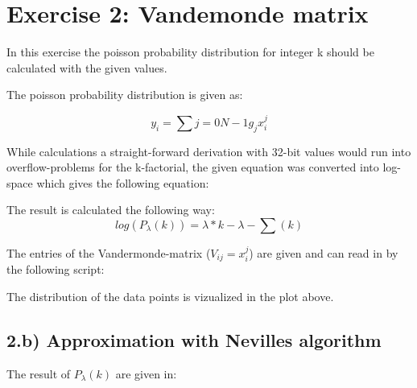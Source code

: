 \section{Exercise 2: Vandemonde matrix}

In this exercise the poisson probability distribution for integer k should be calculated with the given values.

The poisson probability distribution is given as:

\begin{equation}
	y_i = \sum{j=0}{N-1} g_j x_i^j
\end{equation}

While calculations a straight-forward derivation with 32-bit values would run into overflow-problems for the k-factorial, the given equation was converted into log-space which gives the following equation:
 
The result is calculated the following way:
\begin{equation}
	log(P_{\lambda}(k)) = \lambda *k - \lambda - \sum(k)
\end{equation}

The entries of the Vandermonde-matrix ($V_{ij} = x_i^j$) are given and can read in by the following script:
 


The distribution of the data points is vizualized in the plot above.

\subsection{2.b) Approximation with Nevilles algorithm}

The result of $P_{\lambda}(k)$ are given in:


